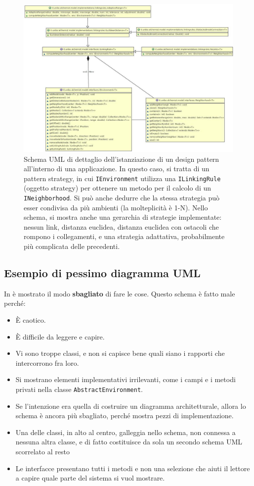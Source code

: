 \documentclass[a4paper,12pt]{report}
\begin{document}
\begin{figure}
\centering{}
\includegraphics[width=\textwidth]{img/strategy}
\caption{Schema UML di dettaglio dell'istanziazione di un design pattern all'interno di una applicazione.
%
In questo caso, si tratta di un pattern strategy, in cui \texttt{IEnvironment} utilizza una \texttt{ILinkingRule} (oggetto strategy) per ottenere un metodo per il calcolo di un \texttt{INeighborhood}.
%
Si può anche dedurre che la stessa strategia può esser condivisa da più ambienti (la molteplicità è 1-N).
%
Nello schema, si mostra anche una gerarchia di strategie implementate: nessun link, distanza euclidea, distanza euclidea con ostacoli che rompono i collegamenti, e una strategia adattativa, probabilmente più complicata delle precedenti.
}
\label{img:strategy}
\end{figure}

\subsection*{Esempio di pessimo diagramma UML}

In  è mostrato il modo \textbf{sbagliato} di fare le cose.
%
Questo schema è fatto male perché:
\begin{itemize}
	\item È caotico.
	\item È difficile da leggere e capire.
	\item Vi sono troppe classi, e non si capisce bene quali siano i rapporti che intercorrono fra loro.
	\item Si mostrano elementi implementativi irrilevanti, come i campi e i metodi privati nella classe \texttt{AbstractEnvironment}.
	\item Se l'intenzione era quella di costruire un diagramma architetturale, allora lo schema è ancora più sbagliato, perché mostra pezzi di implementazione.
	\item Una delle classi, in alto al centro, galleggia nello schema, non connessa a nessuna altra classe, e di fatto costituisce da sola un secondo schema UML scorrelato al resto
	\item Le interfacce presentano tutti i metodi e non una selezione che aiuti il lettore a capire quale parte del sistema si vuol mostrare.
\end{itemize}
\end{document}
